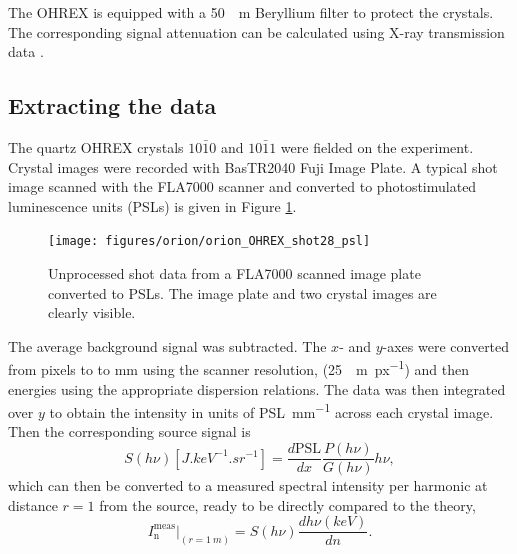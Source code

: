 The OHREX is equipped with a \qty{50}{\mu m} Beryllium filter to protect the crystals. The corresponding signal attenuation can be calculated using X-ray transmission data \cite{henkeXRayInteractionsPhotoabsorption1993a}.

\subsection{Extracting the data}
The quartz OHREX crystals $10\bar{1}0$ and $10\bar{1}1$ were fielded on the experiment. Crystal images were recorded with BasTR2040 Fuji Image Plate. A typical shot image scanned with the FLA7000 scanner and converted to photostimulated luminescence units (PSLs) is given in Figure \ref{fig:orionohrexshot28psl}.
\begin{figure}
	\centering
	\texttt{[image: figures/orion/orion\_OHREX\_shot28\_psl]}
	\caption[Unprocessed IP from ORION experiment]{Unprocessed shot data from a FLA7000 scanned image plate converted to PSLs. The image plate and two crystal images are clearly visible.}
	\label{fig:orionohrexshot28psl}
\end{figure}
The average background signal was subtracted. The $x$- and $y$-axes were converted from pixels to to mm using the scanner resolution, (\qty{25}{\mu m.px^{-1}}) and then energies using the appropriate dispersion relations. The data was then integrated over $y$ to obtain the intensity in units of \unit{PSL.mm^{-1}} across each crystal image. Then the corresponding source signal is
\begin{equation}
	S(h\nu)[\unit{J.keV^{-1}.sr^{-1}}] = \frac{d\mathrm{PSL}}{dx}\frac{P(h\nu)}{G(h\nu)}h\nu,
\end{equation}
which can then be converted to a measured spectral intensity per harmonic at distance $r=1$ from the source, ready to be directly compared to the theory,
\begin{equation}
	I^\mathrm{meas}_\mathrm{n}|_{(r = \qty{1}{m})} = S(h\nu)\frac{dh\nu(keV)}{dn}.
\end{equation}

